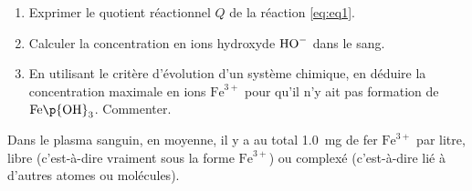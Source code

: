 \documentclass[a4paper,french,bookmarks]{article}
\begin{document}
    \begin{enumerate}
        \item Exprimer le quotient réactionnel $Q$ de la réaction \eqref{eq:eq1}.

        
        \item Calculer la concentration en ions hydroxyde ${\text H\text O}^-$ dans le sang.

        \noafter
        \nobefore\yesafter
        \yesbefore
        
        \item En utilisant le critère d'évolution d'un système chimique, en déduire la concentration maximale en ions $\text{Fe}^{3+}$ pour qu'il n'y ait pas formation de $\text{Fe}\p{\text O\text H}_3$. Commenter.

        \noafter
        \nobefore\yesafter
        \yesbefore
    \end{enumerate}

    Dans le plasma sanguin, en moyenne, il y a au total \qty{1.0}{\mg} de fer $\text{Fe}^{3+}$ par litre, libre (c'est-à-dire vraiment sous la forme $\text{Fe}^{3+}$) ou complexé (c'est-à-dire lié à d'autres atomes ou molécules).
\end{document}
